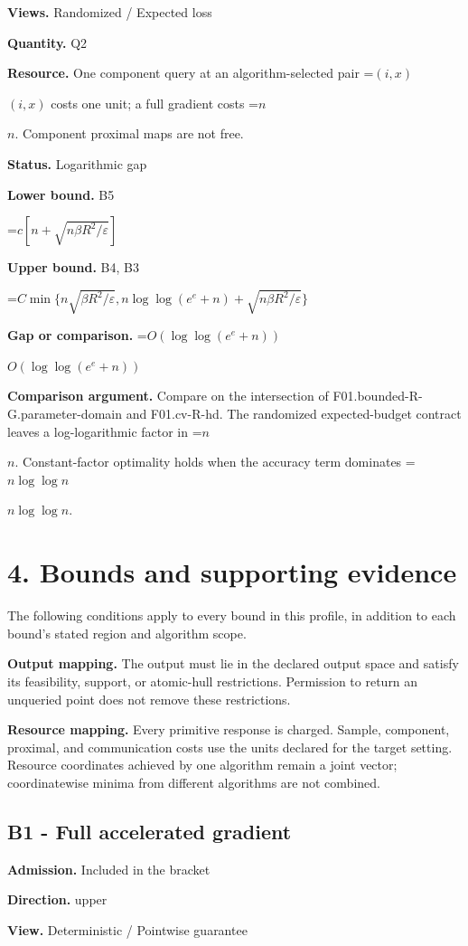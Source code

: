 \documentclass[10pt,a4paper]{article}
\newcommand{\AtlasMath}[1]{\par\begingroup\centering\setbox0=\hbox{$\displaystyle #1$}\ifdim\wd0>1.4\linewidth\typeout{ATLAS WIDE FORMULA: \the\wd0}\fi\ifdim\wd0>\linewidth\resizebox{\linewidth}{!}{\box0}\else\box0\fi\par\endgroup}
\newcommand{\AtlasInlineMath}[1]{\begingroup\setbox0=\hbox{$#1$}\ifdim\wd0>.4\linewidth\endgroup\AtlasMath{#1}\else\endgroup$#1$\fi}
\begin{document}
\textbf{Views.} Randomized / Expected loss

\textbf{Quantity.} Q2

\textbf{Resource.} One component query at an algorithm-selected pair \AtlasInlineMath{(i,x)} costs one unit; a full gradient costs \AtlasInlineMath{n}. Component proximal maps are not free.

\textbf{Status.} Logarithmic gap

\textbf{Lower bound.} B5

\AtlasMath{c[n+\sqrt{n\beta R^2/\varepsilon}]}
\textbf{Upper bound.} B4, B3

\AtlasMath{C\min\{n\sqrt{\beta R^2/\varepsilon},n\log\log(e^e+n)+\sqrt{n\beta R^2/\varepsilon}\}}
\textbf{Gap or comparison.} \AtlasInlineMath{O(\log\log(e^e+n))}

\textbf{Comparison argument.} Compare on the intersection of F01.bounded-R-G.parameter-domain and F01.cv-R-hd. The randomized expected-budget contract leaves a log-logarithmic factor in \AtlasInlineMath{n}. Constant-factor optimality holds when the accuracy term dominates \AtlasInlineMath{n\log\log n}.

\section{4. Bounds and supporting evidence}
The following conditions apply to every bound in this profile, in addition to each bound's stated region and algorithm scope.

\textbf{Output mapping.} The output must lie in the declared output space and satisfy its feasibility, support, or atomic-hull restrictions. Permission to return an unqueried point does not remove these restrictions.

\textbf{Resource mapping.} Every primitive response is charged. Sample, component, proximal, and communication costs use the units declared for the target setting. Resource coordinates achieved by one algorithm remain a joint vector; coordinatewise minima from different algorithms are not combined.

\subsection{B1 - Full accelerated gradient}
\textbf{Admission.} Included in the bracket

\textbf{Direction.} upper

\textbf{View.} Deterministic / Pointwise guarantee
\end{document}
